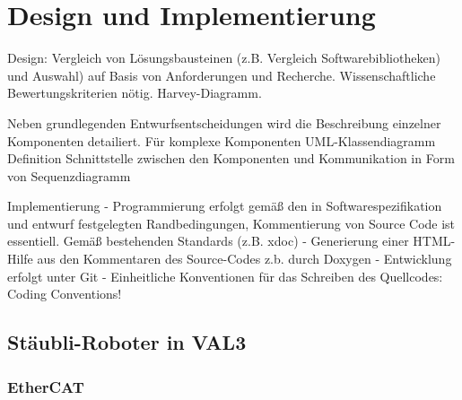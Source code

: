 \documentclass[ a4paper,
                oneside,
                toc=bibliography,
                toc=listof
                ]{scrbook}
\begin{document}
	\chapter{Design und Implementierung}
	Design: Vergleich von Lösungsbausteinen (z.B. Vergleich Softwarebibliotheken) und Auswahl) auf Basis von Anforderungen und Recherche. Wissenschaftliche Bewertungskriterien nötig. Harvey-Diagramm.
	
	Neben grundlegenden Entwurfsentscheidungen wird die Beschreibung einzelner Komponenten detailiert. Für komplexe Komponenten UML-Klassendiagramm
	Definition Schnittstelle zwischen den Komponenten und Kommunikation in Form von Sequenzdiagramm
	
	
	Implementierung
	- Programmierung erfolgt gemäß den in Softwarespezifikation und entwurf festgelegten Randbedingungen, Kommentierung von Source Code ist essentiell. Gemäß bestehenden Standards (z.B. xdoc)
	- Generierung einer HTML-Hilfe aus den Kommentaren des Source-Codes z.b. durch Doxygen
	- Entwicklung erfolgt unter Git
	- Einheitliche Konventionen für das Schreiben des Quellcodes: Coding Conventions!
	\section{Stäubli-Roboter in VAL3}
	
	\subsection{EtherCAT}
	
\end{document}
